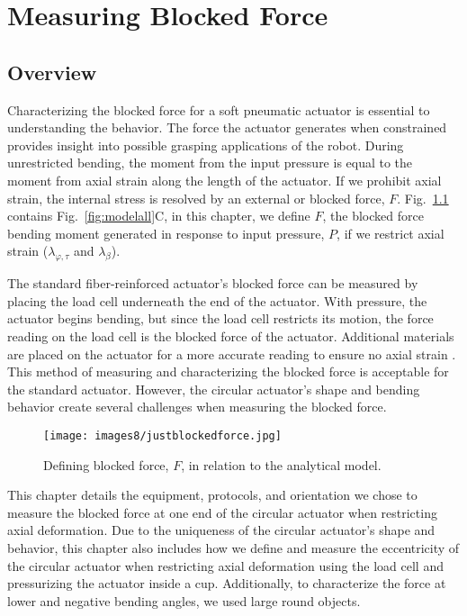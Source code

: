 \chapter{Measuring Blocked Force}
\label{chapter:blockedforce}

\section{Overview}
Characterizing the blocked force for a soft pneumatic actuator is essential to understanding the behavior. The force the actuator generates when constrained provides insight into possible grasping applications of the robot. During unrestricted bending, the moment from the input pressure is equal to the moment from axial strain along the length of the actuator. If we prohibit axial strain, the internal stress is resolved by an external or blocked force, $F$. Fig.~\ref{fig:justblockedforce} contains Fig.~\ref{fig:modelall}C, in this chapter, we define $F$, the blocked force bending moment generated in response to input pressure, $P$, if we restrict axial strain ($\lambda_{\varphi,\tau}$ and $\lambda_\beta$). 

The standard fiber-reinforced actuator's blocked force can be measured by placing the load cell underneath the end of the actuator. With pressure, the actuator begins bending, but since the load cell restricts its motion, the force reading on the load cell is the blocked force of the actuator. Additional materials are placed on the actuator for a more accurate reading to ensure no axial strain \cite{polygerinos_modeling_2015}. This method of measuring and characterizing the blocked force is acceptable for the standard actuator. However, the circular actuator's shape and bending behavior create several challenges when measuring the blocked force. 

\begin{figure}[!ht]
    \centering
     \texttt{[image: images8/justblockedforce.jpg]}
    \caption{Defining blocked force, $F$, in relation to the analytical model.}
    \label{fig:justblockedforce}
\end{figure}

This chapter details the equipment, protocols, and orientation we chose to measure the blocked force at one end of the circular actuator when restricting axial deformation. Due to the uniqueness of the circular actuator's shape and behavior, this chapter also includes how we define and measure the eccentricity of the circular actuator when restricting axial deformation using the load cell and pressurizing the actuator inside a cup. Additionally, to characterize the force at lower and negative bending angles, we used large round objects. 

